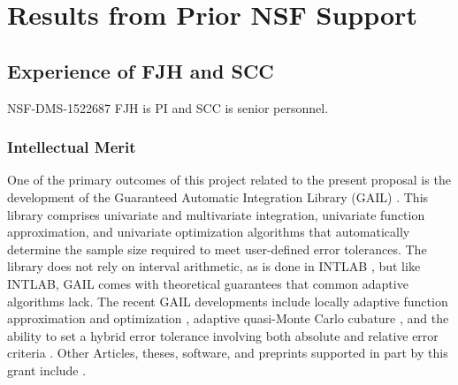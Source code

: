 \documentclass[11pt]{NSFamsart}
\begin{document}
\section{Results from Prior NSF Support} 
\subsection{Experience of FJH and SCC}
NSF-DMS-1522687 \label{SectFJHPrevious}  FJH is PI and SCC is senior personnel.  

\subsubsection{Intellectual Merit}
One of the primary outcomes of this project related to the present proposal is the development of the Guaranteed Automatic Integration Library (GAIL) \cite{ChoEtal17b}.  This library comprises univariate and multivariate integration, univariate function approximation, and univariate optimization algorithms that automatically determine the sample size required to meet user-defined error tolerances.  The library does not rely on interval arithmetic, as is done in INTLAB \cite{MoKeCl09, Rum99a, Rum10a}, but like INTLAB, GAIL comes with theoretical guarantees that common adaptive algorithms lack. The recent GAIL developments include locally adaptive function approximation and optimization \cite{ChoEtal17a, Din15a}, adaptive quasi-Monte Carlo cubature \cite{HicJim16a, JimHic16a}, and the ability to set a hybrid error tolerance involving both absolute and relative error criteria \cite{HicEtal17a}.  Other Articles, theses,  software, and preprints supported in part by this grant include 
\cite{ala_augmented_2017, 
	GilEtal16a,
	GilJim16b,
	HicEtal18a,	
	Hic17a,
	JohFasHic18a,
	Li16a,
	Liu17a,
	mccourt_stable_2017,
	mishra_hybrid_nodate,
	mishra_stable_nodate, 
	rashidinia_stable_nodate,
	vu_rbf-fd_nodate,
	Zha17a,
	Zho15a,
	ZhoHic15a}.
    
\end{document}
